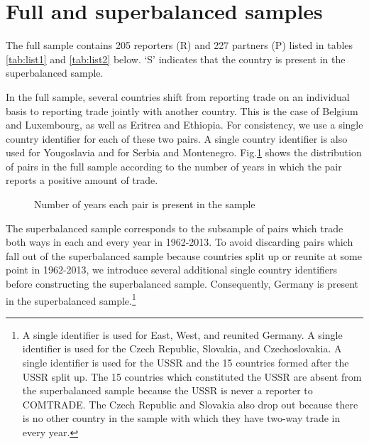 \documentclass[12pt,twoside,a4paper,notitlepage]{article}
\begin{document}
{\section{Full and superbalanced samples} \label{app:E}
The full sample contains 205 reporters (R) and 227 partners (P) listed in tables \ref{tab:list1} and \ref{tab:list2} below.
`S' indicates that the country is present in the superbalanced sample.


In the full sample, several countries shift from reporting trade on an individual basis to reporting trade jointly with another country.
This is the case of Belgium and Luxembourg, as well as Eritrea and Ethiopia.
For consistency, we use a single country identifier for each of these two pairs.
A single country identifier is also used for Yougoslavia and for Serbia and Montenegro.
Fig.\ref{fig:pairpresence} shows the distribution of pairs in the full sample according to the number of years in which the pair reports a positive amount of trade.

\begin{figure}[h!]
\begin{center}
\setlength{\fboxrule}{1pt} %
\setlength{\fboxsep}{.1in} %
\end{center}
\caption{Number of years each pair is present in the sample \label{fig:pairpresence}}
\end{figure}

The superbalanced sample corresponds to the subsample of pairs which trade both ways in each and every year in 1962-2013.
To avoid discarding pairs which fall out of the superbalanced sample because countries split up or reunite at some point in 1962-2013, we introduce several additional single country identifiers before constructing the superbalanced sample.
Consequently, Germany is present in the superbalanced sample.\footnote{A single identifier is used for East, West, and reunited Germany.
A single identifier is used for the Czech Republic, Slovakia, and Czechoslovakia.
A single identifier is used for the USSR and the 15 countries formed after the USSR split up.
The 15 countries which constituted the USSR are absent from the superbalanced sample because the USSR is never a reporter to COMTRADE.
The Czech Republic and Slovakia also drop out because there is no other country in the sample with which they have two-way trade in every year.} 

}
\end{document}

